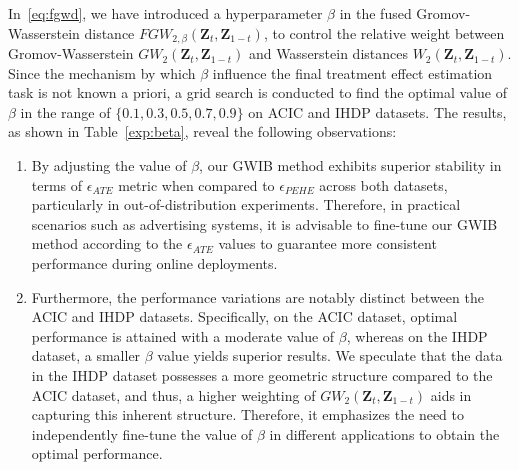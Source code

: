 \documentclass{article}
\begin{document}
In~\eqref{eq:fgwd}, we have introduced a hyperparameter $\beta$ in the fused Gromov-Wasserstein distance $FGW_{2,\beta}(\bm{Z}_t, \bm{Z}_{1-t})$, to control the relative weight between Gromov-Wasserstein $GW_2(\bm{Z}_t, \bm{Z}_{1-t})$ and Wasserstein distances $W_2(\bm{Z}_t, \bm{Z}_{1-t})$. 
Since the mechanism by which $\beta$ influence the final treatment effect estimation task is not known a priori, a grid search is conducted to find the optimal value of $\beta$ in the range of $\{0.1, 0.3, 0.5, 0.7, 0.9\}$ on ACIC and IHDP datasets. 
The results, as shown in Table~\ref{exp:beta}, reveal the following observations:
\begin{enumerate}
\item By adjusting the value of $\beta$, our GWIB method exhibits superior stability in terms of $\epsilon_{ATE}$ metric when compared to $\epsilon_{PEHE}$ across both datasets, particularly in out-of-distribution experiments. Therefore, in practical scenarios such as advertising systems, it is advisable to fine-tune our GWIB method according to the $\epsilon_{ATE}$ values to guarantee more consistent performance during online deployments.

\item Furthermore, the performance variations are notably distinct between the ACIC and IHDP datasets. 
Specifically, on the ACIC dataset, optimal performance is attained with a moderate value of $\beta$, whereas on the IHDP dataset, a smaller $\beta$ value yields superior results. 
We speculate that the data in the IHDP dataset possesses a more geometric structure compared to the ACIC dataset, and thus, a higher weighting of $GW_2(\bm{Z}_t, \bm{Z}_{1-t})$ aids in capturing this inherent structure. 
Therefore, it emphasizes the need to independently fine-tune the value of $\beta$ in different applications to obtain the optimal performance.
\end{enumerate}
\end{document}
